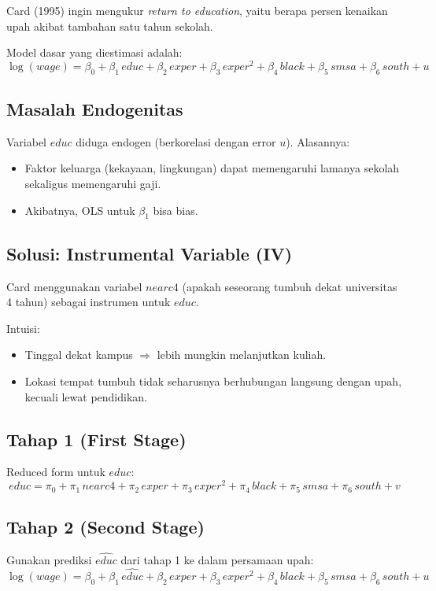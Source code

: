 \documentclass[]{article}
\begin{document}
Card (1995) ingin mengukur \textit{return to education}, yaitu berapa persen 
kenaikan upah akibat tambahan satu tahun sekolah.  

Model dasar yang diestimasi adalah:
\[
\log(wage) 
= \beta_{0} + \beta_{1} \, educ + \beta_{2} \, exper + \beta_{3} \, exper^{2} 
+ \beta_{4} \, black + \beta_{5} \, smsa + \beta_{6} \, south + u
\]

\subsection*{Masalah Endogenitas}
Variabel $educ$ diduga endogen (berkorelasi dengan error $u$).  
Alasannya:
\begin{itemize}
    \item Faktor keluarga (kekayaan, lingkungan) dapat memengaruhi lamanya sekolah sekaligus memengaruhi gaji.
    \item Akibatnya, OLS untuk $\beta_1$ bisa bias.
\end{itemize}

\subsection*{Solusi: Instrumental Variable (IV)}
Card menggunakan variabel $nearc4$ (apakah seseorang tumbuh dekat universitas 4 tahun) 
sebagai instrumen untuk $educ$.  

Intuisi:
\begin{itemize}
    \item Tinggal dekat kampus $\Rightarrow$ lebih mungkin melanjutkan kuliah.
    \item Lokasi tempat tumbuh tidak seharusnya berhubungan langsung dengan upah, kecuali lewat pendidikan.
\end{itemize}

\subsection*{Tahap 1 (First Stage)}
Reduced form untuk $educ$:
\[
educ = \pi_{0} + \pi_{1} \, nearc4 + \pi_{2} \, exper + \pi_{3} \, exper^{2} 
+ \pi_{4} \, black + \pi_{5} \, smsa + \pi_{6} \, south + v
\]

\subsection*{Tahap 2 (Second Stage)}
Gunakan prediksi $\hat{educ}$ dari tahap 1 ke dalam persamaan upah:
\[
\log(wage) 
= \beta_{0} + \beta_{1} \, \hat{educ} + \beta_{2} \, exper + \beta_{3} \, exper^{2} 
+ \beta_{4} \, black + \beta_{5} \, smsa + \beta_{6} \, south + u
\]
 
\end{document}
